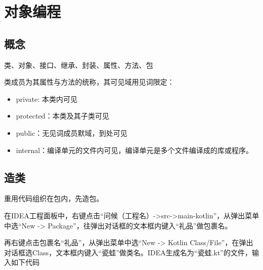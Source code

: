 \chapter{对象编程}

\section{概念}
类、对象、接口、继承、封装、属性、方法、包

类成员为其属性与方法的统称，其可见域用见词限定：
\begin{itemize}
    \item private: 本类内可见
    \item protected：本类及其子类可见
    \item public：无见词成员默域，到处可见
    \item internal：编译单元的文件内可见，编译单元是多个文件编译成的库或程序。
\end{itemize}

\section{造类}
重用代码组织在包内，先造包。

在IDEA工程面板中，右键点击“问候（工程名）->src->main-kotlin”，从弹出菜单中选“New -> Package”，往弹出对话框的文本框内键入“礼品”做包裹名。

再右键点击包裹名“礼品”，从弹出菜单中选“New -> Kotlin Class/File”，在弹出对话框选Class，文本框内键入“瓷蛙”做类名。IDEA生成名为“瓷蛙.kt”的文件，输入如下代码

